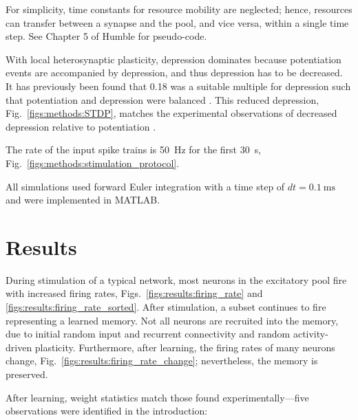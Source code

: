 \documentclass[utf8]{FrontiersinHarvard} %
\begin{document}
For simplicity, time constants for resource mobility are neglected; hence, resources can transfer between a synapse and the pool, and vice versa, within a single time step. See Chapter 5 of Humble \citeyearpar{Humble.2013} for pseudo-code.

With local heterosynaptic plasticity, depression dominates because potentiation events are accompanied by depression, and thus depression has to be decreased. It has previously been found that \SI{0.18}{} was a suitable multiple for depression such that potentiation and depression were balanced \citep{Humble.2013}. This reduced depression, Fig.~\ref{figs:methods:STDP}, matches the experimental observations of decreased depression relative to potentiation \citep{Bi.1998}.

The rate of the input spike trains is \SI{50}{\hertz} for the first \SI{30}{\second}, Fig.~\ref{figs:methods:stimulation_protocol}.

All simulations used forward Euler integration with a time step of $dt=\SI{0.1}{\milli\second}$ and were implemented in MATLAB.

\section{Results}
During stimulation of a typical network, most neurons in the excitatory pool fire with increased firing rates, Figs.~\ref{figs:results:firing_rate} and \ref{figs:results:firing_rate_sorted}. After stimulation, a subset continues to fire representing a learned memory. Not all neurons are recruited into the memory, due to initial random input and recurrent connectivity and random activity-driven plasticity. Furthermore, after learning, the firing rates of many neurons change, Fig.~\ref{figs:results:firing_rate_change}; nevertheless, the memory is preserved.

After learning, weight statistics match those found experimentally---five observations were identified in the introduction:
\end{document}
